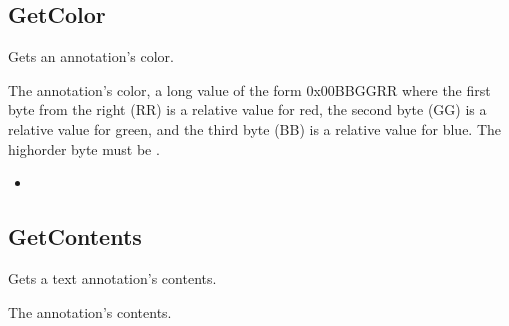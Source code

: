 \documentclass[letterpaper,12pt,english,openany,oneside]{sphinxmanual}
\begin{document}
\subsection{GetColor}
\label{\detokenize{IAC_API_OLE_Objects:getcolor}}
Gets an annotation’s color.


\begin{sphinxVerbatim}[commandchars=\\\{\}]
 
\end{sphinxVerbatim}


The annotation’s color, a long value of the form 0x00BBGGRR where the first byte from the right (RR) is a relative value for red, the second byte (GG) is a relative value for green, and the third byte (BB) is a relative value for blue. The high\sphinxhyphen{}order byte must be .

\label{\detokenize{IAC_API_OLE_Objects:related-methods-66}}
\begin{itemize}
\item {} 
 

\end{itemize}




\subsection{GetContents}
\label{\detokenize{IAC_API_OLE_Objects:getcontents}}
Gets a text annotation’s contents.


\begin{sphinxVerbatim}[commandchars=\\\{\}]
 
\end{sphinxVerbatim}


The annotation’s contents.
\end{document}
